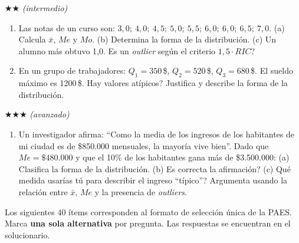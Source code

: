 \documentclass[11pt, letterpaper]{article}
\newcommand{\seccionheader}[2]{%
  \vspace{1.6em}
  \noindent{\Large\bfseries\color{#1} #2}\par
  \vspace{0.4em}{\noindent\color{#1}\rule{\linewidth}{0.8pt}}
  \vspace{1.0em}}
\begin{document}
$\bigstar\bigstar$ \textit{(intermedio)}

\begin{enumerate}[label=\textbf{\arabic*.}, leftmargin=*, resume]
  \item Las notas de un curso son: $3{,}0;\ 4{,}0;\ 4{,}5;\ 5{,}0;\ 5{,}5;\ 6{,}0;\ 6{,}0;\ 6{,}5;\ 7{,}0$.
  (a) Calcula $\bar{x}$, $Me$ y $Mo$. (b) Determina la forma de la distribuci\'on. (c) Un alumno m\'as obtuvo 1{,}0. \textquestiondown Es un \textit{outlier} seg\'un el criterio $1{,}5 \cdot RIC$?

  \item En un grupo de trabajadores: $Q_1 = 350$\,\$, $Q_2 = 520$\,\$, $Q_3 = 680$\,\$. El sueldo m\'aximo es 1200\,\$. \textquestiondown Hay valores at\'ipicos? Justifica y describe la forma de la distribuci\'on.
\end{enumerate}

$\bigstar\bigstar\bigstar$ \textit{(avanzado)}

\begin{enumerate}[label=\textbf{\arabic*.}, leftmargin=*, resume]
  \item Un investigador afirma: ``Como la media de los ingresos de los habitantes de mi ciudad es de \$850.000 mensuales, la mayor\'ia vive bien''. Dado que $Me = \$480.000$ y que el 10\% de los habitantes gana m\'as de \$3.500.000:
  (a) Clasifica la forma de la distribuci\'on. (b) \textquestiondown Es correcta la afirmaci\'on? (c) \textquestiondown Qu\'e medida usar\'ias t\'u para describir el ingreso ``t\'ipico''? Argumenta usando la relaci\'on entre $\bar{x}$, $Me$ y la presencia de \textit{outliers}.
  \vspace{3.5cm}
\end{enumerate}

\clearpage
\seccionheader{blockb}{Ejercicios tipo PAES}
\label{sec:paes}

\begin{tcolorbox}[importantbox, title={Instrucciones}]
Los siguientes 40 \'items corresponden al formato de selecci\'on \'unica de la PAES. Marca \textbf{una sola alternativa} por pregunta. Las respuestas se encuentran en el solucionario.
\end{tcolorbox}
\end{document}
